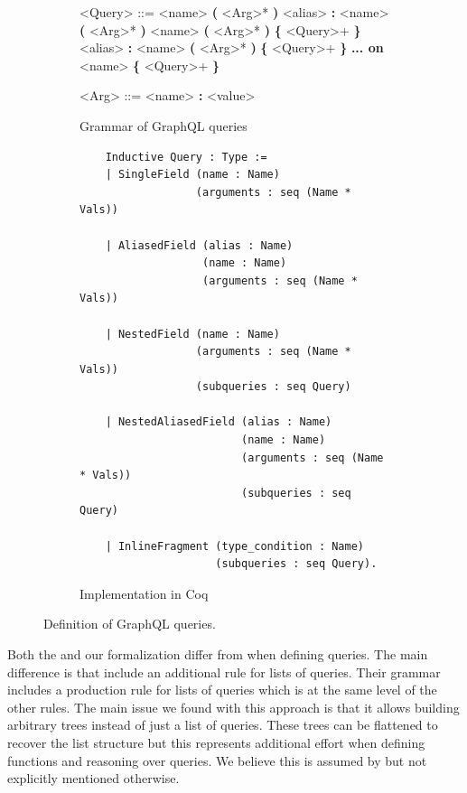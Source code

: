 \begin{figure}
  \centering
  \begin{subfigure}{.5\textwidth}
    \begin{grammar}
        <Query> ::= <name> \textbf{(} <Arg>* \textbf{)}
        \alt <alias> \textbf{:} <name> \textbf{(} <Arg>* \textbf{)}
        \alt <name> \textbf{(} <Arg>* \textbf{)} \textbf{\{} <Query>+ \textbf{\}}
        \alt <alias> \textbf{:} <name> \textbf{(} <Arg>* \textbf{)} \textbf{\{} <Query>+ \textbf{\}}
        \alt \textbf{... on} <name> \textbf{\{} <Query>+ \textbf{\}}

        <Arg> ::= <name> \textbf{:} <value>
    \end{grammar}
    \caption{Grammar of GraphQL queries}
  \end{subfigure}%
  \begin{subfigure}{.5\textwidth}

    \begin{verbatim}
    Inductive Query : Type :=
    | SingleField (name : Name)
                  (arguments : seq (Name * Vals))

    | AliasedField (alias : Name)
                   (name : Name)
                   (arguments : seq (Name * Vals))

    | NestedField (name : Name)
                  (arguments : seq (Name * Vals))
                  (subqueries : seq Query)

    | NestedAliasedField (alias : Name)
                         (name : Name)
                         (arguments : seq (Name * Vals))
                         (subqueries : seq Query)

    | InlineFragment (type_condition : Name)
                     (subqueries : seq Query).
    \end{verbatim}
    \caption{Implementation in Coq}
  \end{subfigure}
  \caption{Definition of GraphQL queries.}
  \label{fig:query_def}
\end{figure}


Both the \spec{} and our formalization differ from \HP{} when defining queries. The main difference is that \HP{} include an additional rule for lists of queries. Their grammar includes a production rule for lists of queries which is at the same level of the other rules. The main issue we found with this approach is that it allows building arbitrary trees instead of just a list of queries. These trees can be flattened to recover the list structure but this represents additional effort when defining functions and reasoning over queries. We believe this is assumed by \HP{} but not explicitly mentioned otherwise.


